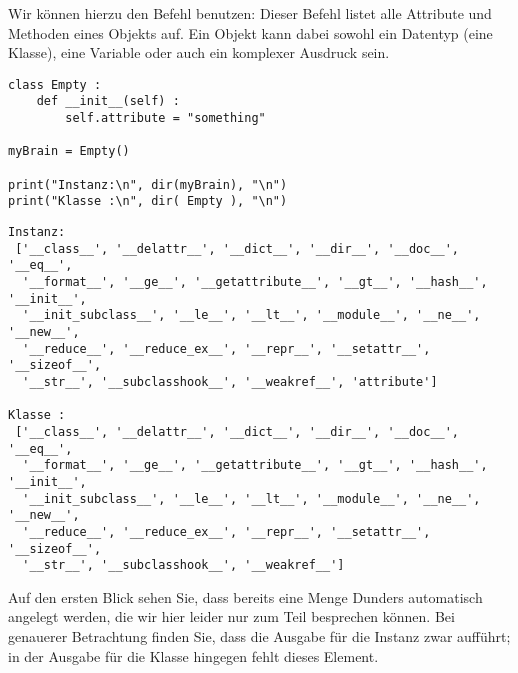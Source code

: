 Wir können hierzu den Befehl  benutzen: Dieser Befehl listet alle Attribute und Methoden eines Objekts auf. Ein Objekt kann dabei sowohl ein Datentyp (\ie eine Klasse), eine Variable oder auch ein komplexer Ausdruck sein.

\begin{codebox}
\begin{verbatim}
class Empty :
    def __init__(self) :
        self.attribute = "something"

myBrain = Empty()

print("Instanz:\n", dir(myBrain), "\n")
print("Klasse :\n", dir( Empty ), "\n")
\end{verbatim}
\end{codebox}
\begin{cmdbox}
\begin{verbatim}
Instanz:
 ['__class__', '__delattr__', '__dict__', '__dir__', '__doc__', '__eq__', 
  '__format__', '__ge__', '__getattribute__', '__gt__', '__hash__', '__init__', 
  '__init_subclass__', '__le__', '__lt__', '__module__', '__ne__', '__new__', 
  '__reduce__', '__reduce_ex__', '__repr__', '__setattr__', '__sizeof__', 
  '__str__', '__subclasshook__', '__weakref__', 'attribute'] 

Klasse :
 ['__class__', '__delattr__', '__dict__', '__dir__', '__doc__', '__eq__', 
  '__format__', '__ge__', '__getattribute__', '__gt__', '__hash__', '__init__', 
  '__init_subclass__', '__le__', '__lt__', '__module__', '__ne__', '__new__', 
  '__reduce__', '__reduce_ex__', '__repr__', '__setattr__', '__sizeof__', 
  '__str__', '__subclasshook__', '__weakref__']
\end{verbatim}
\end{cmdbox}
Auf den ersten Blick sehen Sie, dass bereits eine Menge Dunders automatisch angelegt werden, die wir hier leider nur zum Teil besprechen können. Bei genauerer Betrachtung finden Sie, dass die Ausgabe für die Instanz zwar  aufführt; in der Ausgabe für die Klasse hingegen fehlt dieses Element.

